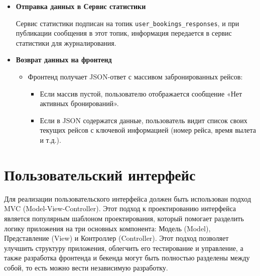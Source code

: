 \begin{enumerate}
\begin{itemize}
        \item \textbf{Отправка данных в Сервис статистики}

        Сервис статистики подписан на топик \texttt{user\_bookings\_responses}, и при публикации сообщения в этот топик, информация передается в сервис статистики для журналирования.

        \item \textbf{Возврат данных на фронтенд}
        \begin{itemize}
            \item Фронтенд получает JSON-ответ с массивом забронированных рейсов:
            \begin{itemize}
                \item Если массив пустой, пользователю отображается сообщение «Нет активных бронирований».
                \item Если в JSON содержатся данные, пользователь видит список своих текущих рейсов с ключевой информацией (номер рейса, время вылета и т.д.).
            \end{itemize}
        \end{itemize}

    \end{itemize}

\end{enumerate}

\section*{Пользовательский интерфейс}

Для реализации пользовательского интерфейса должен быть использован подход MVC (Model-View-Controller). Этот подход к проектированию интерфейса является популярным шаблоном проектирования, который помогает разделить логику приложения на три основных компонента: Модель (Model), Представление (View) и Контроллер (Controller). Этот подход позволяет улучшить структуру приложения, облегчить его тестирование и управление, а также разработка фронтенда и бекенда могут быть полностью разделены между собой, то есть можно вести независимую разработку.

